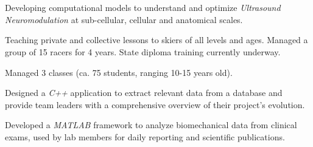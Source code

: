 \documentclass[a4paper]{cv}
\begin{document}
\begin{center}
\\
\vspace{5pt}
\\
\details
\end{center}
\begin{minipage}[t]{0.6\textwidth}

\experience

Developing computational models to understand and optimize \emph{Ultrasound Neuromodulation} at sub-cellular, cellular and anatomical scales.
\sectionspace

Teaching private and collective lessons to skiers of all levels and ages. Managed a group of 15 racers for 4 years. State diploma training currently underway.
\sectionspace

Managed 3 classes (ca. 75 students, ranging 10-15 years old).
\sectionspace

Designed a \emph{C++} application to extract relevant data from a database and provide team leaders with a comprehensive overview of their project's evolution.
\sectionspace

Developed a \emph{MATLAB} framework to analyze biomechanical data from clinical exams, used by lab members for daily reporting and scientific publications.\sectionspace


\end{minipage}
\end{document}
